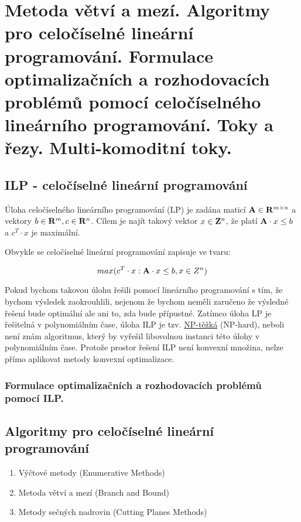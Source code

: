 \section[KO - ILP, toky]{Metoda větví a mezí. Algoritmy pro celočíselné lineární programování. Formulace optimalizačních a rozhodovacích problémů pomocí celočíselného lineárního programování. Toky a řezy. Multi-komoditní toky.}

\subsection*{ILP - celočíselné lineární programování}

Úloha celočíselného lineárního programování (LP) je zadána maticí ${\bf A} \in {\bf R}^{m \times n}$ a vektory $b \in {\bf R}^m, c \in {\bf R}^n$. Cílem je najít takový vektor $x \in {\bf Z}^n$, že platí ${\bf A} \cdot x \leq b$ a $c^T \cdot x$ je maximální.

Obvykle se celočíselné lineární programování zapisuje ve tvaru:

	$$max(c^T \cdot x : {\bf A} \cdot x \leq b, x \in Z^n)$$
	
Pokud bychom takovou úlohu řešili pomocí lineárního programování s tím, že bychom výsledek zaokrouhlili, nejenom že bychom neměli zaručeno že výsledné řešení bude optimální ale ani to, zda bude přípustné. 
Zatímco úloha LP je řešitelná v polynomiálním čase, úloha ILP je tzv. \hyperref[heading:npc]{NP-těžká} (NP-hard), neboli není znám algoritmus, který by vyřešil libovolnou instanci této úlohy v polynomiálním čase. Protože prostor řešení ILP není konvexní množina, nelze přímo aplikovat metody konvexní optimalizace.

\subsubsection*{Formulace optimalizačních a rozhodovacích problémů pomocí ILP.}

\subsection*{Algoritmy pro celočíselné lineární programování}
\begin{enumerate}
	\item Výčtové metody (Enumerative Methods)
	\item Metoda větví a mezí (Branch and Bound)
	\item Metody sečných nadrovin (Cutting Planes Methods)
\end{enumerate}

